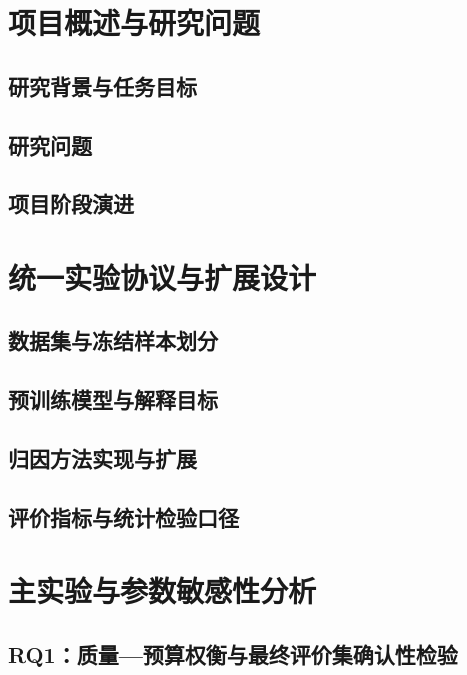 
\chapter{项目概述与研究问题}

\section{研究背景与任务目标}

\section{研究问题}

\section{项目阶段演进}

\chapter{统一实验协议与扩展设计}

\section{数据集与冻结样本划分}

\section{预训练模型与解释目标}

\section{归因方法实现与扩展}

\section{评价指标与统计检验口径}

\chapter{主实验与参数敏感性分析}

\section{RQ1：质量—预算权衡与最终评价集确认性检验}

